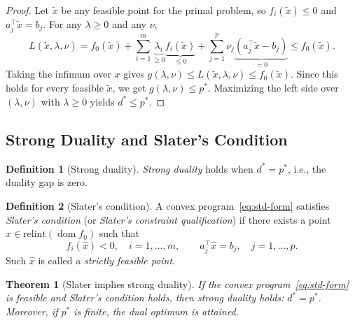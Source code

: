 \documentclass[11pt,a4paper]{article}
\theoremstyle{definition}
\newtheorem{definition}{Definition}[section]
\theoremstyle{plain}
\newtheorem{theorem}{Theorem}[section]
\theoremstyle{remark}
\DeclareMathOperator{\dom}{dom}
\begin{document}
\begin{proof}
Let $\tilde{x}$ be any feasible point for the primal problem, so
$f_i(\tilde{x}) \le 0$ and $a_j^\top \tilde{x} = b_j$. For any
$\lambda \ge 0$ and any $\nu$,
\[
  L(\tilde{x}, \lambda, \nu)
  = f_0(\tilde{x}) + \sum_{i=1}^m \underbrace{\lambda_i}_{\ge 0}
    \underbrace{f_i(\tilde{x})}_{\le 0}
  + \sum_{j=1}^p \nu_j \underbrace{(a_j^\top \tilde{x} - b_j)}_{= 0}
  \le f_0(\tilde{x}).
\]
Taking the infimum over $x$ gives $g(\lambda, \nu) \le L(\tilde{x}, \lambda, \nu) \le f_0(\tilde{x})$.
Since this holds for every feasible $\tilde{x}$, we get $g(\lambda, \nu) \le p^*$.
Maximizing the left side over $(\lambda, \nu)$ with $\lambda \ge 0$ yields
$d^* \le p^*$.
\end{proof}

\subsection{Strong Duality and Slater's Condition}

\begin{definition}[Strong duality]\label{def:strong-duality}
\emph{Strong duality} holds when $d^* = p^*$, i.e., the duality gap is zero.
\end{definition}

\begin{definition}[Slater's condition]\label{def:slater}
A convex program~\eqref{eq:std-form} satisfies \emph{Slater's condition}
(or \emph{Slater's constraint qualification}) if there exists a point
$\hat{x} \in \text{relint}(\dom f_0)$ such that
\[
  f_i(\hat{x}) < 0, \quad i = 1,\dots,m, \qquad
  a_j^\top \hat{x} = b_j, \quad j = 1,\dots,p.
\]
Such $\hat{x}$ is called a \emph{strictly feasible point}.
\end{definition}

\begin{theorem}[Slater implies strong duality]\label{thm:strong-duality}
If the convex program~\eqref{eq:std-form} is feasible and Slater's condition
holds, then strong duality holds: $d^* = p^*$. Moreover, if $p^*$ is finite,
the dual optimum is attained.
\end{theorem}
\end{document}
